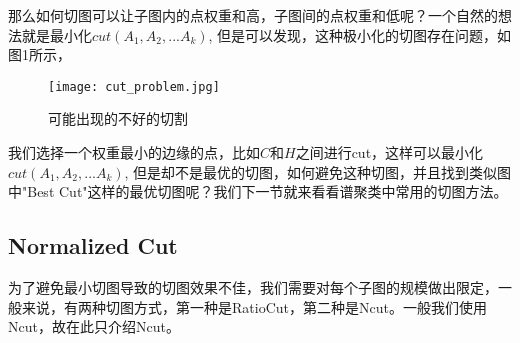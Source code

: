 那么如何切图可以让子图内的点权重和高，子图间的点权重和低呢？一个自然的想法就是最小化$cut(A_1,A_2,...A_k)$, 但是可以发现，这种极小化的切图存在问题，如图1所示，
\begin{figure}[h]
    \centering
    \texttt{[image: cut\_problem.jpg]}
    \caption{可能出现的不好的切割}
\end{figure}
我们选择一个权重最小的边缘的点，比如$C$和$H$之间进行cut，这样可以最小化$cut(A_1,A_2,...A_k)$, 但是却不是最优的切图，如何避免这种切图，并且找到类似图中"Best Cut"这样的最优切图呢？我们下一节就来看看谱聚类中常用的切图方法。

\subsection{Normalized Cut}
为了避免最小切图导致的切图效果不佳，我们需要对每个子图的规模做出限定，一般来说，有两种切图方式，第一种是RatioCut，第二种是Ncut。一般我们使用Ncut，故在此只介绍Ncut。

